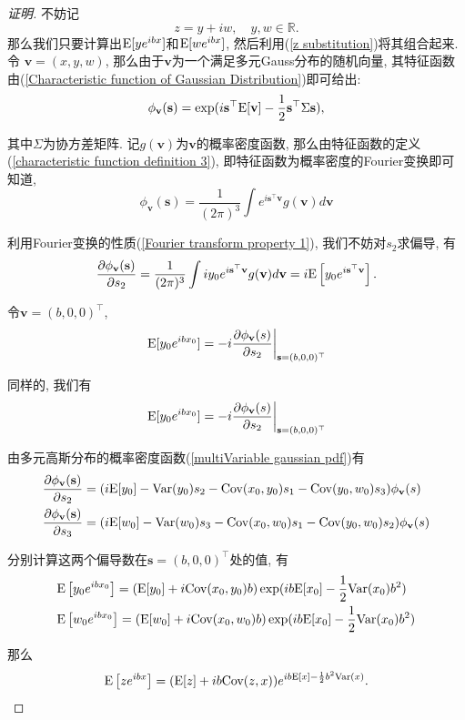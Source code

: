 \documentclass[notitlepage,cs4size,punct,oneside]{ctexrep}
\numberwithin{equation}{section}
\theoremstyle{mystyle}
\begin{document}
\begin{proof}[证明]
不妨记
$$z = y + iw, \quad y, w\in \mathbb{R}. \label{z substitution}$$
那么我们只要计算出$\text{E}[ye^{ibx}]$和$\text{E}[we^{ibx}]$, 然后利用(\ref{z substitution})将其组合起来. 令
$\mathbf{v} = (x, y, w)$, 那么由于$\mathbf{v}$为一个满足多元Gauss分布的随机向量, 其特征函数由(\ref{Characteristic function of Gaussian Distribution})即可给出:
\[
\phi_\mathbf{v}(\mathbf{s}) = \exp(i\mathbf{s}^\top \text{E}[\mathbf{v}]-\frac{1}{2}\mathbf{s}^\top\Sigma\mathbf{s}),
\]

其中$\Sigma$为协方差矩阵. 记$g(\mathbf{v})$为$\mathbf{v}$的概率密度函数, 那么由特征函数的定义(\ref{characteristic function definition 3}), 即特征函数为概率密度的Fourier变换即可知道,
\[
\phi_\mathbf{v}(\mathbf{s}) = \frac{1}{(2\pi)^3}\int e^{i\mathbf{s}^\top\mathbf{v}}g(\mathbf{v})d\mathbf{v}
\]

利用Fourier变换的性质(\ref{Fourier transform property 1}), 我们不妨对$s_2$求偏导\cite{gershgorin2008nonlinear}, 有
\[
\frac{\partial \phi_\mathbf{v}(\mathbf{s})}{\partial s_2} = \frac{1}{(2\pi)^3}\int iy_0e^{i\mathbf{s}^\top\mathbf{v}}g(\mathbf{v})d\mathbf{v} = i\text{E}\left[y_0e^{i\mathbf{s}^\top\mathbf{v}}\right].
\]

令$\mathbf{v} = (b, 0, 0)^\top$,
\[
\left.\text{E}[y_0e^{ibx_0}] = -i\frac{\partial \phi_\mathbf{v}(s)}{\partial s_2}\right|_{\mathbf{s} = (b, 0, 0)^\top}
\]

同样的, 我们有
\[
\left.\text{E}[y_0e^{ibx_0}] = -i\frac{\partial \phi_\mathbf{v}(s)}{\partial s_2}\right|_{\mathbf{s} = (b, 0, 0)^\top}
\]

由多元高斯分布的概率密度函数(\ref{multiVariable gaussian pdf})有
\[
\begin{split}
&\frac{\partial \phi_\mathbf{v}(\mathbf{s})}{\partial s_2} = (i\text{E}[y_0]-\text{Var}(y_0)s_2-\text{Cov}(x_0, y_0)s_1-\text{Cov}(y_0, w_0)s_3)\phi_{\mathbf{v}}(s) \\
&\frac{\partial \phi_\mathbf{v}(\mathbf{s})}{\partial s_3} = (i\text{E}[w_0]-\text{Var}(w_0)s_3-\text{Cov}(x_0, w_0)s_1-\text{Cov}(y_0, w_0)s_2)\phi_{\mathbf{v}}(s)
\end{split}
\]

分别计算这两个偏导数在$\mathbf{s} = (b, 0, 0)^\top$处的值, 有
\[
\begin{split}
&\text{E}\left[y_0e^{ibx_0}\right] = (\text{E}[y_0]+i\text{Cov}(x_0, y_0)b)\exp(ib\text{E}[x_0] - \frac{1}{2}\text{Var}(x_0)b^2) \\
&\text{E}\left[w_0e^{ibx_0}\right] = (\text{E}[w_0]+i\text{Cov}(x_0, w_0)b)\exp(ib\text{E}[x_0] - \frac{1}{2}\text{Var}(x_0)b^2)
\end{split}
\]

那么
$$\text{E}\left[ze^{ibx}\right] = (\text{E}[z]+ib\text{Cov}(z, x))e^{ib\text{E}[x]-\frac{1}{2}b^2\text{Var}(x)}.$$
\end{proof}
\end{document}
